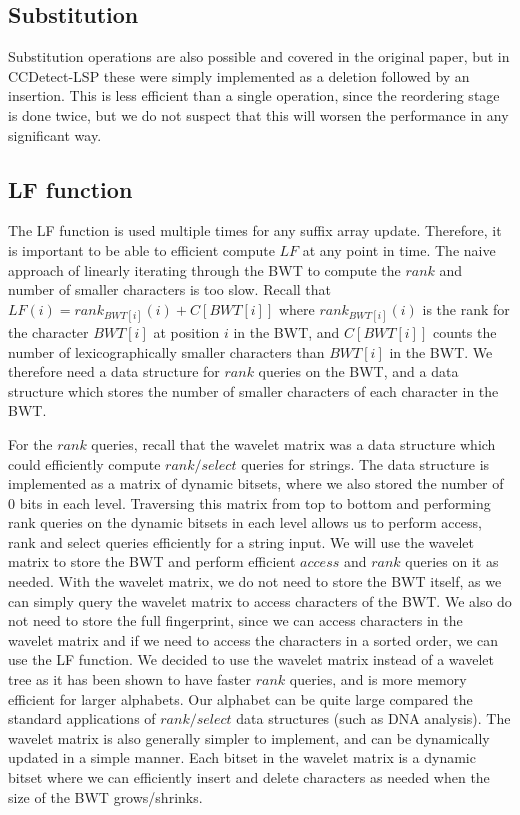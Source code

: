 \subsection*{Substitution}

Substitution operations are also possible and covered in the original paper, but in
CCDetect-LSP these were simply implemented as a deletion followed by an insertion. This is
less efficient than a single operation, since the reordering stage is done twice, but we
do not suspect that this will worsen the performance in any significant way.

\subsection*{LF function}

The LF function is used multiple times for any suffix array update. Therefore, it is
important to be able to efficient compute $LF$ at any point in time. The naive approach of
linearly iterating through the BWT to compute the $rank$ and number of smaller characters
is too slow. Recall that $LF(i) = rank_{BWT[i]}(i) + C[BWT[i]]$ where $rank_{BWT[i]}(i)$
is the rank for the character $BWT[i]$ at position $i$ in the BWT, and $C[BWT[i]]$ counts
the number of lexicographically smaller characters than $BWT[i]$ in the BWT. We therefore
need a data structure for $rank$ queries on the BWT, and a data structure which stores the
number of smaller characters of each character in the BWT. 

For the $rank$ queries, recall that the wavelet matrix was a data structure which could
efficiently compute $rank/select$ queries for strings. The data structure is implemented
as a matrix of dynamic bitsets, where we also stored the number of 0 bits in each level.
Traversing this matrix from top to bottom and performing rank queries on the dynamic
bitsets in each level allows us to perform access, rank and select queries efficiently for
a string input. We will use the wavelet matrix to store the BWT and perform efficient
$access$ and $rank$ queries on it as needed. With the wavelet matrix, we do not need to
store the BWT itself, as we can simply query the wavelet matrix to access characters of
the BWT. We also do not need to store the full fingerprint, since we can access characters
in the wavelet matrix and if we need to access the characters in a sorted order, we can
use the LF function. We decided to use the wavelet matrix instead of a wavelet tree as it
has been shown to have faster $rank$ queries, and is more memory efficient for larger
alphabets. Our alphabet can be quite large compared the standard applications of
$rank/select$ data structures (such as DNA analysis). The wavelet matrix is also generally
simpler to implement, and can be dynamically updated in a simple manner. Each bitset in
the wavelet matrix is a dynamic bitset where we can efficiently insert and delete
characters as needed when the size of the BWT grows/shrinks.

